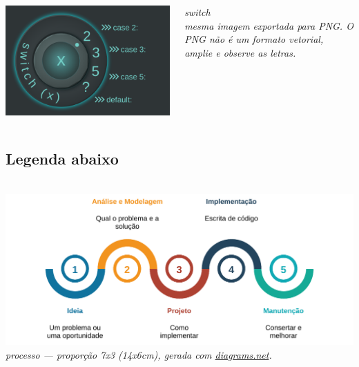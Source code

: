\documentclass[aspectratio=169]{beamer}
\begin{document}
\begin{frame}[t]\frametitle{\secname}\framesubtitle{\subsecname}
  \begin{columns}[T]
    \begin{column}{9.75cm}
      \includegraphics[width=\columnwidth]{images/bitmap/switch.png}%
    \end{column}
    \begin{column}{4.25cm}
      \it\alert{switch}\\
      mesma imagem exportada para PNG.
      O PNG não é um formato vetorial, amplie e observe as letras.
    \end{column}
  \end{columns}
\end{frame}

\subsection{Legenda abaixo}

\begin{frame}[t]\frametitle{\secname}\framesubtitle{\subsecname}
  \begin{columns}[T]
    \begin{column}{\textwidth}
      \includegraphics[width=\columnwidth]{images/pdf/etapas.pdf}%
      \\
      \it\alert{processo} --- proporção 7x3 (14x6cm), gerada com \href{https://app.diagrams.net/}{diagrams.net}.
    \end{column}
  \end{columns}
\end{frame}
\end{document}
